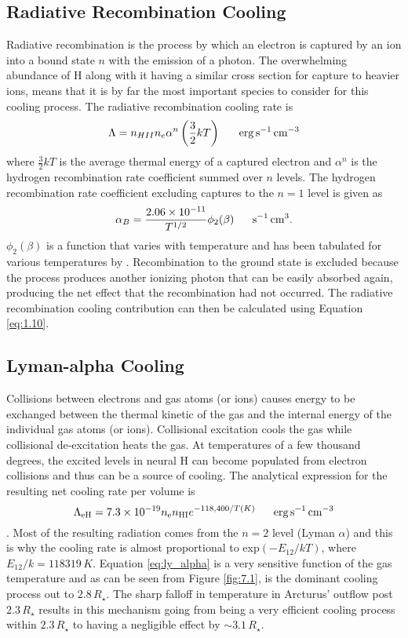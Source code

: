 \subsection{Radiative Recombination Cooling}\label{sec:7.3.2}
Radiative recombination is the process by which an electron is captured by an ion into a bound state $n$ with the emission of a photon. The overwhelming abundance of H along with it having a similar cross section for capture to heavier ions, means that it is by far the most important species to consider for this cooling process. The radiative recombination cooling rate is 
\begin{equation}
\Lambda = n_{HII}n_e  \alpha ^{n}\left(\frac{3}{2}kT\right) \ \ \ \ \ \rm{erg\,s^{-1}\,cm^{-3}}
\end{equation}
where $\frac{3}{2}kT$ is the average thermal energy of a captured electron and $\alpha ^{n}$ is the hydrogen recombination rate coefficient summed over $n$ levels. The hydrogen recombination rate coefficient excluding captures to the $n=1$ level is given as 
\begin{equation}
\alpha _{B}= \frac{2.06\times 10^{-11}}{T^{1/2}}\phi _{2}(\beta) \ \ \ \ \ \rm{s^{-1}\,cm^{3}}.
\end{equation}
$\phi _{2}(\beta)$ is a function that varies with temperature and has been tabulated for various temperatures by \citep{spitzer_1978}. Recombination to the ground state is excluded because the process produces another ionizing
photon that can be easily absorbed again, producing the net effect that the recombination had not occurred. The radiative recombination cooling contribution can then be calculated using Equation \ref{eq:1.10}.

\subsection{Lyman-alpha Cooling}\label{sec:7.3.3}
Collisions between electrons and gas atoms (or ions) causes energy to be exchanged between the thermal kinetic of the gas and the internal energy of the individual gas atoms (or ions). Collisional excitation cools the gas while collisional de-excitation heats the gas. At temperatures of a few thousand degrees, the excited levels in neural H can become populated from electron collisions and thus can be a source of cooling. The analytical expression for the resulting net cooling rate per volume is
\begin{equation}
\label{eq:ly_alpha}
\Lambda _{\rm{eH}} = 7.3\times 10^{-19}n_{\rm{e}}n_{\rm{HI}}e^{-118,400/T(K)} \ \ \ \ \ \rm{erg\,s^{-1}\,cm^{-3}}
\end{equation}
\cite{spitzer_1978}. Most of the resulting radiation comes from the $n=2$ level (Lyman $\alpha$) and this is why the cooling rate is almost proportional to exp$(-E_{12}/kT)$, where $E_{12}/k=118319\,K$. Equation \ref{eq:ly_alpha} is a very sensitive function of the gas temperature and as can be seen from Figure \ref{fig:7.1}, is the dominant cooling process out to $2.8\,R_{\star}$. The sharp falloff in temperature in Arcturus' outflow post $2.3\,R_{\star}$ results in this mechanism going from being a very efficient cooling process within $2.3\,R_{\star}$ to having a negligible effect by $\sim 3.1\,R_{\star}$.

